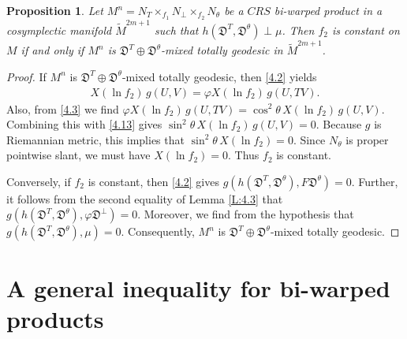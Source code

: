 \documentclass[reqno]{amsart}
\theoremstyle{plain}
\newtheorem{proposition}{Proposition}[section]
\theoremstyle{remark}
\numberwithin{equation}{section}
\begin{document}
 
\begin{proposition}\label{P:4.2}
Let $M^n=N_T\times_{f_1}N_\perp\times_{f_2}N_\theta$ be a $CRS$ bi-warped product in a cosymplectic manifold $\widetilde M^{2m+1}$ such that $h({\mathfrak{D}^{T}}, {\mathfrak{D}}^\theta)\perp\mu$. Then $f_2$ is constant on $M$ if and only if $M^n$ is ${\mathfrak{D}^{T}}\oplus{\mathfrak{D}}^\theta$-mixed totally geodesic in $\widetilde M^{2m+1}$.
\end{proposition}
 \begin{proof} If $M^n$ is ${\mathfrak{D}^{T}}\oplus{\mathfrak{D}}^\theta$-mixed totally geodesic, then \eqref{4.2} yields
 \begin{align}\label{4.13}
X(\ln f_2)\,g(U, V)=\varphi X(\ln f_2)\,g(U, TV).
\end{align}
Also, from \eqref{4.3} we find
$\varphi X(\ln f_2)\,g(U, TV)=\cos^2\theta\,X(\ln f_2)\,g(U, V)$. Combining this with
 \eqref{4.13} gives $\sin^2\theta\,X(\ln f_2)\,g(U, V)=0$.
Because $g$ is Riemannian metric,  this implies that $\sin^2\theta\, X(\ln f_2)=0.$ Since $N_\theta$ is proper pointwise slant, we must have
$X(\ln f_2)=0$. Thus $f_2$ is constant. 

Conversely, if $f_2$ is constant, then  \eqref{4.2} gives
 $g(h(\mathfrak{D}^{T}, \mathfrak{D}^\theta),F\mathfrak{D}^\theta)=0$.
Further, it follows from the second equality of Lemma \ref{L:4.3} that
$g(h(\mathfrak{D}^{T}, \mathfrak{D}^\theta), \varphi \mathfrak{D}^\perp)=0.$
Moreover, we find from the hypothesis that
$g(h(\mathfrak{D}^{T}, \mathfrak{D}^\theta), \mu)=0$. Consequently, $M^n$ is ${\mathfrak{D}^{T}}\oplus\mathfrak{D}^\theta$-mixed totally geodesic.
\end{proof}






\section{A general inequality for bi-warped products}\label{S5}
\end{document}
